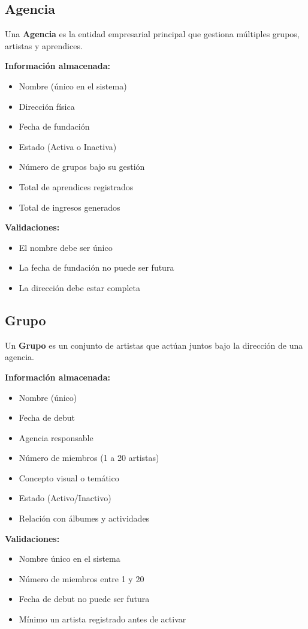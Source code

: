 \documentclass[12pt,a4paper,spanish,oneside]{report}
\begin{document}
\subsection{Agencia}

Una \textbf{Agencia} es la entidad empresarial principal que gestiona múltiples grupos, artistas y aprendices.

\textbf{Información almacenada:}
\begin{itemize}
\item Nombre (único en el sistema)
\item Dirección física
\item Fecha de fundación
\item Estado (Activa o Inactiva)
\item Número de grupos bajo su gestión
\item Total de aprendices registrados
\item Total de ingresos generados
\end{itemize}

\textbf{Validaciones:}
\begin{itemize}
\item El nombre debe ser único
\item La fecha de fundación no puede ser futura
\item La dirección debe estar completa
\end{itemize}

\subsection{Grupo}

Un \textbf{Grupo} es un conjunto de artistas que actúan juntos bajo la dirección de una agencia.

\textbf{Información almacenada:}
\begin{itemize}
\item Nombre (único)
\item Fecha de debut
\item Agencia responsable
\item Número de miembros (1 a 20 artistas)
\item Concepto visual o temático
\item Estado (Activo/Inactivo)
\item Relación con álbumes y actividades
\end{itemize}

\textbf{Validaciones:}
\begin{itemize}
\item Nombre único en el sistema
\item Número de miembros entre 1 y 20
\item Fecha de debut no puede ser futura
\item Mínimo un artista registrado antes de activar
\end{itemize}
\end{document}
